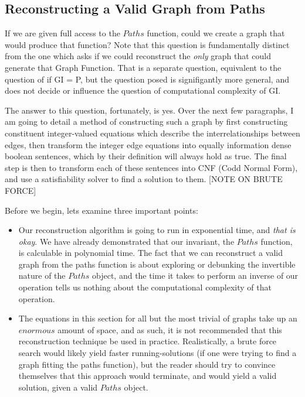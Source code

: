 \subsection{Reconstructing a Valid Graph from Paths}
If we are given full access to the $Paths$ function, could we create a graph that would produce that function?
Note that this question is fundamentally distinct from the one which asks if we could reconstruct the \emph{only} graph that could generate that Graph Function.
That is a separate question, equivalent to the question of if GI = P, but the question posed is signifigantly more general, and does not decide or influence the question of computational complexity of GI.

The answer to this question, fortunately, is yes.  
Over the next few paragraphs, I am going to detail a method of constructing such a graph by first constructing constituent integer-valued equations which describe the interrelationships between edges, then transform the integer edge equations into equally information dense boolean sentences, which by their definition will always hold as true.  
The final step is then to transform each of these sentences into CNF (Codd Normal Form), and use a satisfiability solver to find a solution to them.
[NOTE ON BRUTE FORCE]

Before we begin, lets examine three important points:
\begin{itemize}
  \item{
  	Our reconstruction algorithm is going to run in exponential time, and \emph{that is okay}.  
  	We have already demonstrated that our invariant, the $Paths$ function, is calculable in polynomial time.  
  	The fact that we can reconstruct a valid graph from the paths function is about exploring or debunking the invertible nature of the $Paths$ object, 
  	and the time it takes to perform an inverse of our operation tells us nothing about the computational complexity of that operation.
  }
  \item{
  	The equations in this section for all but the most trivial of graphs take up an $enormous$ amount of space, and as such, it is not recommended that this reconstruction technique be used in practice.  
  	Realistically, a brute force search would likely yield faster running-solutions (if one were trying to find a graph fitting the paths function), but the reader should try to convince themselves that this approach would terminate, 
  	and would yield a valid solution, given a valid $Paths$ object.
  }
\end{itemize}

